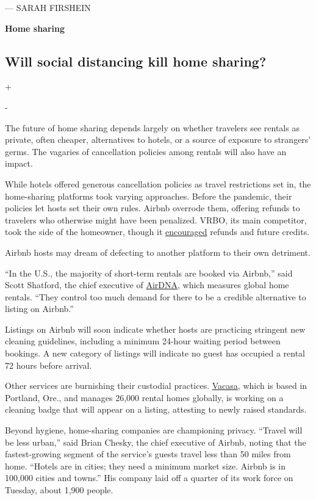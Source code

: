 --- SARAH FIRSHEIN

\textbf{Home sharing}

\hypertarget{will-social-distancing-kill-home-sharing}{%
\subsection{Will social distancing kill home
sharing?}\label{will-social-distancing-kill-home-sharing}}

+

-

The future of home sharing depends largely on whether travelers see
rentals as private, often cheaper, alternatives to hotels, or a source
of exposure to strangers' germs. The vagaries of cancellation policies
among rentals will also have an impact.

While hotels offered generous cancellation policies as travel
restrictions set in, the home-sharing platforms took varying approaches.
Before the pandemic, their policies let hosts set their own rules.
Airbnb overrode them, offering refunds to travelers who otherwise might
have been penalized. VRBO, its main competitor, took the side of the
homeowner, though it
\href{https://help.vrbo.com/articles/What-can-I-do-if-my-reservation-is-affected-by-the-Coronavirus?_ga=2.40507106.1577521592.1588085811-204612396.1588085811}{encouraged}
refunds and future credits.

Airbnb hosts may dream of defecting to another platform to their own
detriment.

``In the U.S., the majority of short-term rentals are booked via
Airbnb,'' said Scott Shatford, the chief executive of
\href{https://www.airdna.co/}{Air}\href{https://www.airdna.co/}{DNA},
which measures global home rentals. ``They control too much demand for
there to be a credible alternative to listing on Airbnb.''

Listings on Airbnb will soon indicate whether hosts are practicing
stringent new cleaning guidelines, including a minimum 24-hour waiting
period between bookings. A new category of listings will indicate no
guest has occupied a rental 72 hours before arrival.

Other services are burnishing their custodial practices.
\href{https://www.vacasa.com/}{Vacasa}, which is based in Portland,
Ore., and manages 26,000 rental homes globally, is working on a cleaning
badge that will appear on a listing, attesting to newly raised
standards.

Beyond hygiene, home-sharing companies are championing privacy. ``Travel
will be less urban,'' said Brian Chesky, the chief executive of Airbnb,
noting that the fastest-growing segment of the service's guests travel
less than 50 miles from home. ``Hotels are in cities; they need a
minimum market size. Airbnb is in 100,000 cities and towns.'' His
company laid off a quarter of its work force on Tuesday, about 1,900
people.

